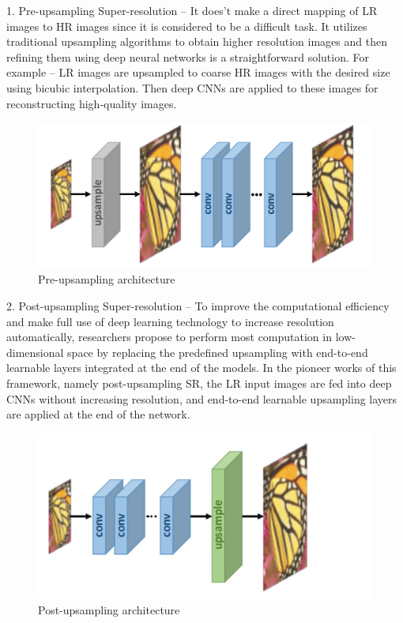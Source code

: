 1. Pre-upsampling Super-resolution – It does’t make a direct mapping of LR images to HR images since it is considered to be a difficult task. It utilizes traditional upsampling algorithms to obtain higher resolution images and then refining them using deep neural networks is a straightforward solution. For example – LR images are upsampled to coarse HR images with the desired size using bicubic interpolation. Then deep CNNs are applied to these images for reconstructing high-quality images.
\begin{figure}[h]
    \centering
    \includegraphics[totalheight=1.4in]{Chapter2/image15.png}
    \caption{Pre-upsampling architecture \cite{DLSR}}
    \label{fig:test6}
\end{figure}

2. Post-upsampling Super-resolution – To improve the computational efficiency and make full use of deep learning technology to increase resolution automatically, researchers propose to perform most computation in low-dimensional space by replacing the predefined upsampling with end-to-end learnable layers integrated at the end of the models. In the pioneer works of this framework, namely post-upsampling SR, the LR input images are fed into deep CNNs without increasing resolution, and end-to-end learnable upsampling layers are applied at the end of the network.
\begin{figure}[h]
    \centering
    \includegraphics[totalheight=1.4in]{Chapter2/image16.jpeg}
    \caption{Post-upsampling architecture \cite{DLSR}}
    \label{fig:test7}
\end{figure}

